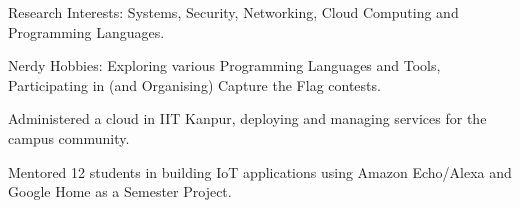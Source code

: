 


\begin{cventries}
  \cventry
    {}
    {}
    {}
    {}
    {
      \vspace{-4.0mm}
      \begin{cvitems}
          \item Research Interests: Systems, Security, Networking, Cloud Computing and Programming Languages.
          \item Nerdy Hobbies: Exploring various Programming Languages and Tools, Participating in (and Organising) Capture the Flag contests.
          \item Administered a cloud in IIT Kanpur, deploying and managing services for the campus community.
          \item Mentored 12 students in building IoT applications using Amazon Echo/Alexa and Google Home as a Semester Project.
      \end{cvitems}
    }
\end{cventries}

